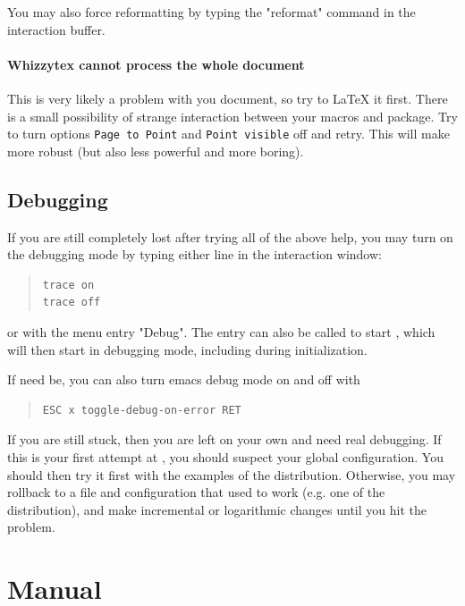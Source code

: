 \documentclass[12pt]{article}
\begin{document}
You may also force reformatting by typing the \lst"reformat" command
in the interaction buffer. 


\paragraph {Whizzytex cannot process the whole document}

This is very likely a problem with you document, so try to {\LaTeX} it 
first. There is a small possibility of strange interaction between
your macros and {\whizzy} package. Try to turn options 
{\tt Page to Point} and {\tt Point visible} off and retry. 
This will make {\whizzy} more robust (but also less powerful and more
boring). 

\subsection {Debugging}

If you are still completely lost after trying all of the above help, you may
turn on the debugging mode by typing either line in the interaction window:
\begin{quote}
\begin{verbatim}
trace on
trace off
\end{verbatim}
\end{quote}
or with the menu entry \lst"Debug".
The entry can also be called to start {\whizzy}, which will then start in 
debugging mode, including during initialization. 

If need be, you can also turn emacs debug mode on and off with
\begin{quote}
\begin{verbatim}
ESC x toggle-debug-on-error RET
\end{verbatim}
\end{quote}

If you are still stuck, then you are left on your own and need real
debugging.  If this is your first attempt at {\whizzy}, you should suspect
your global configuration. You should then try it first with the examples of
the distribution.  Otherwise, you may rollback to a file and configuration
that used to work (e.g. one of the distribution), and make incremental or
logarithmic changes until you hit the problem. 


\section{Manual} 
\label{manual}
\end{document}
